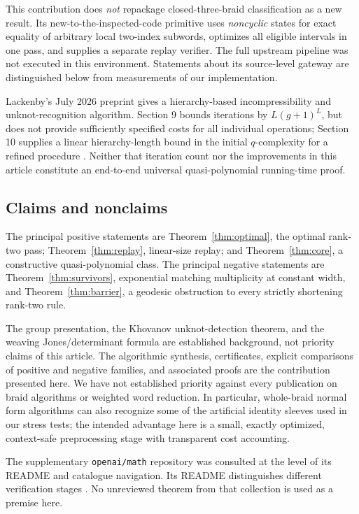 \documentclass[11pt]{article}
\theoremstyle{definition}
\theoremstyle{remark}
\begin{document}
This contribution does \emph{not} repackage closed-three-braid classification
as a new result. Its new-to-the-inspected-code primitive uses \emph{noncyclic}
states for exact equality of arbitrary local two-index subwords, optimizes all
eligible intervals in one pass, and supplies a separate replay verifier.
The full upstream pipeline was not executed in this environment. Statements
about its source-level gateway are distinguished below from measurements of
our implementation.

Lackenby's July 2026 preprint gives a hierarchy-based incompressibility and
unknot-recognition algorithm. Section 9 bounds iterations by $L(g+1)^L$, but
does not provide sufficiently specified costs for all individual operations;
Section 10 supplies a linear hierarchy-length bound in the initial
$q$-complexity for a refined procedure \cite[\S\S9--10]{lackenby2026}.
Neither that iteration count nor the improvements in this article constitute
an end-to-end universal quasi-polynomial running-time proof.

\subsection{Claims and nonclaims}
The principal positive statements are Theorem~\ref{thm:optimal}, the optimal
rank-two pass; Theorem~\ref{thm:replay}, linear-size replay; and
Theorem~\ref{thm:core}, a constructive quasi-polynomial class. The principal
negative statements are Theorem~\ref{thm:survivors}, exponential matching
multiplicity at constant width, and Theorem~\ref{thm:barrier}, a geodesic
obstruction to every strictly shortening rank-two rule.

The group presentation, the Khovanov unknot-detection theorem, and the weaving
Jones/determinant formula are established background, not priority claims of
this article. The algorithmic synthesis, certificates, explicit comparisons of
positive and negative families, and associated proofs are the contribution
presented here. We have not established priority against every publication on
braid algorithms or weighted word reduction. In particular, whole-braid normal
form algorithms can also recognize some of the artificial identity sleeves
used in our stress tests; the intended advantage here is a small, exactly
optimized, context-safe preprocessing stage with transparent cost accounting.

The supplementary \texttt{openai/math} repository was consulted at the level of
its README and catalogue navigation. Its README distinguishes different
verification stages \cite{openai-math}. No unreviewed theorem from that
collection is used as a premise here.
\end{document}
